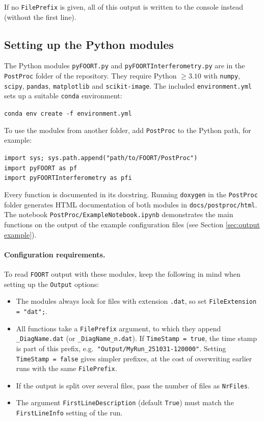 \documentclass[11pt,a4paper]{article}
\newcommand{\code}[1]{{\tt #1}}
\begin{document}
If no \code{FilePrefix} is given, all of this output is written to the console instead (without the first line).

\subsection{Setting up the Python modules}\label{sec:python setup}

The Python modules \code{pyFOORT.py} and \code{pyFOORTInterferometry.py} are in the \code{PostProc} folder of the repository. They require Python $\geq 3.10$ with \code{numpy}, \code{scipy}, \code{pandas}, \code{matplotlib} and \code{scikit-image}. The included \code{environment.yml} sets up a suitable \code{conda} environment:
\begin{center}
\code{conda env create -f environment.yml}\qquad \code{conda activate foort-postproc}
\end{center}
To use the modules from another folder, add \code{PostProc} to the Python path, for example:
\begin{center}
\code{import sys; sys.path.append("path/to/FOORT/PostProc")}\\
\code{import pyFOORT as pf}\\
\code{import pyFOORTInterferometry as pfi}
\end{center}
Every function is documented in its docstring. Running \code{doxygen} in the \code{PostProc} folder generates HTML documentation of both modules in \code{docs/postproc/html}. The notebook \code{PostProc/ExampleNotebook.ipynb} demonstrates the main functions on the output of the example configuration files (see Section \ref{sec:output example}).

\paragraph{Configuration requirements.} To read \code{FOORT} output with these modules, keep the following in mind when setting up the \code{Output} options:
\begin{itemize}
 \item The modules always look for files with extension \code{.dat}, so set \code{FileExtension = "dat";}.
 \item All functions take a \code{FilePrefix} argument, to which they append \code{\_DiagName.dat} (or \code{\_DiagName\_n.dat}). If \code{TimeStamp = true}, the time stamp is part of this prefix, e.g.\ \code{"Output/MyRun\_251031-120000"}. Setting \code{TimeStamp = false} gives simpler prefixes, at the cost of overwriting earlier runs with the same \code{FilePrefix}.
 \item If the output is split over several files, pass the number of files as \code{NrFiles}.
 \item The argument \code{FirstLineDescription} (default \code{True}) must match the \code{FirstLineInfo} setting of the run.
\end{itemize}
\end{document}
